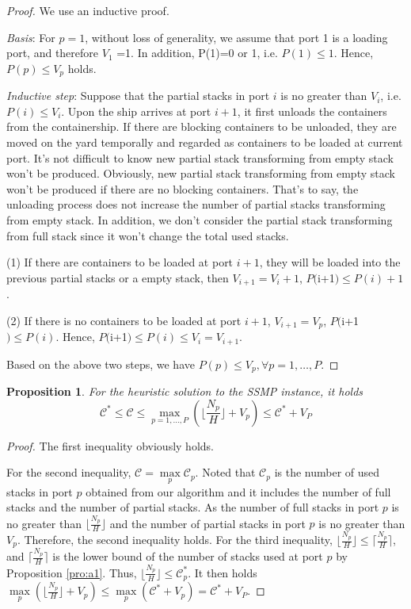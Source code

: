 \documentclass[review,3p,times,authoryear,12pt]{elsarticle}
\newtheorem{proposition}{Proposition}
\begin{document}
\begin{proof}

We use an inductive proof.

\textit{Basis}: For $p=1$, without loss of generality, we assume that port 1 is a loading port, and therefore $V_1$ =1.
In addition, P(1)=0 or 1, i.e. $P(1) \le 1$. Hence, $P(p) \le V_p $ holds.

\textit{Inductive step}: Suppose that the partial stacks in port $i$ is no greater than $V_i$, i.e. $P(i) \le V_i $.
Upon the ship arrives at port $i+1$, it first unloads the containers from the containership.
If there are blocking containers to be unloaded, they are moved on the yard temporally and regarded as containers to be loaded at current port.
It's not difficult to know new partial stack transforming from empty stack won't be produced.
Obviously, new partial stack transforming from empty stack won't be produced if there are no blocking containers.
That's to say, the unloading process does not increase the number of partial stacks transforming from empty stack.
In addition, we don't consider the partial stack transforming from full stack since it won't change the total used stacks.

(1) If there are containers to be loaded at port $i+1$, they will be loaded into the previous partial stacks or a empty stack, then $V_{i+1}=V_i+1$,  $P($i+1$) \le P(i)+1$.

(2) If there is no containers to be loaded at port $i+1$,  $V_{i+1}=V_p$, $P($i+1$) \le P(i)$. Hence, $P($i+1$) \le P(i) \le V_{i}=V_{i+1}$.

Based on the above two steps, we have $P(p) \le V_p,  \forall p=1,\ldots,P$.
\end{proof}


\begin{proposition}
For the heuristic solution to the SSMP instance, it holds
\begin{equation*}
\mathcal{C}^* \le \mathcal{C} \le \max_{p=1,\ldots,P}(\lfloor\frac{N_p}{H}\rfloor+V_p) \le \mathcal{C}^*+V_P
\end{equation*}
\label{pro:a3}
\end{proposition}

\begin{proof}

The first inequality obviously holds.

For the second inequality, $\mathcal{C}=\max\limits_p \mathcal{C}_p$.
Noted that $\mathcal{C}_p$ is the number of used stacks in port $p$ obtained from our algorithm and it includes the number of full stacks and the number of partial stacks.
As the number of full stacks in port $p$ is no greater than $\lfloor\frac{N_p}{H}\rfloor$ and the number of partial stacks in port $p$ is no greater than $V_p$.
Therefore, the second inequality holds.
For the third inequality, $\lfloor\frac{N_p}{H}\rfloor\leq \lceil\frac{N_p}{H}\rceil$, and $\lceil\frac{N_p}{H}\rceil$ is the lower bound of the number of stacks used at port $p$ by Proposition \ref{pro:a1}.
Thus, $\lfloor\frac{N_p}{H}\rfloor \le \mathcal{C}_p^*$.
It then holds $\max\limits_p(\lfloor\frac{N_p}{H}\rfloor+V_p) \le \max\limits_p(\mathcal{C}^*+V_p) = \mathcal{C}^*+V_P$.
\end{proof}
\end{document}
